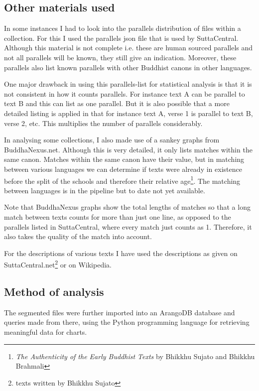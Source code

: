 \subsection{Other materials used}
In some instances I had to look into the parallels distribution of files within a collection. For this I used the parallels json file that is used by SuttaCentral. Although this material is not complete i.e. these are human sourced parallels and not all parallels will be known, they still give an indication. Moreover, these parallels also list known parallels with other Buddhist canons in other languages.

One major drawback in using this parallels-list for statistical analysis is that it is not consistent in how it counts parallels. For instance text A can be parallel to text B and this can list as one parallel. But it is also possible that a more detailed listing is applied in that for instance text A, verse 1 is parallel to text B, verse 2, etc. This multiplies the number of parallels considerably. 

In analysing some collections, I also made use of a sankey graphs from BuddhaNexus.net. Although this is very detailed, it only lists matches within the same canon. Matches within the same canon have their value, but in matching between various languages we can determine if texts were already in existence before the split of the schools and therefore their relative age\footnote{{\em The Authenticity of the Early Buddhist Texts} by Bhikkhu Sujato and Bhikkhu Brahmali}. The matching between languages is in the pipeline but to date not yet available. 

Note that BuddhaNexus graphs show the total lengths of matches so that a long match between texts counts for more than just one line, as opposed to the parallels listed in SuttaCentral, where every match just counts as 1. Therefore, it also takes the quality of the match into account.

For the descriptions of various texts I have used the descriptions as given on SuttaCentral.net\footnote{texts written by Bhikkhu Sujato} or on Wikipedia.

\subsection{Method of analysis}
The segmented files were further imported into an ArangoDB database and queries made from there, using the Python programming language for retrieving meaningful data for charts.

